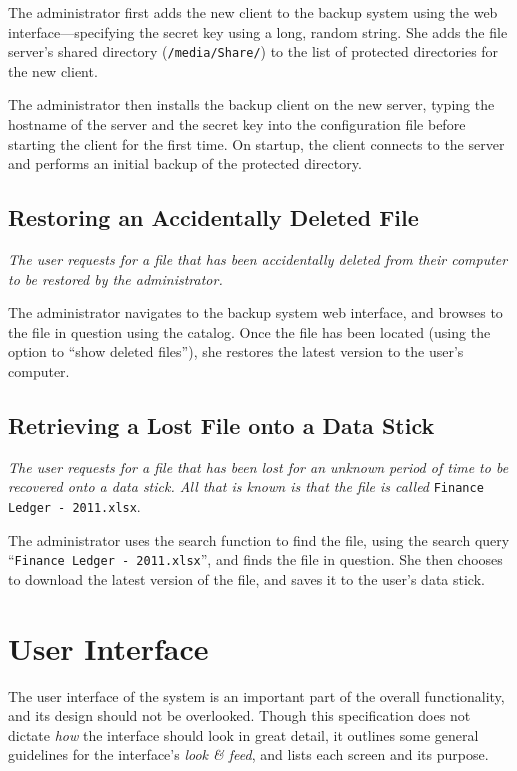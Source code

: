 The administrator first adds the new client to the backup system using the web
interface---specifying the secret key using a long, random string. She adds the
file server's shared directory (\verb!/media/Share/!) to the list of protected
directories for the new client.

The administrator then installs the backup client on the new server, typing
the hostname of the server and the secret key into the configuration file
before starting the client for the first time. On startup, the client connects
to the server and performs an initial backup of the protected directory.

\subsection{Restoring an Accidentally Deleted File}

\emph{The user requests for a file that has been accidentally deleted from
their computer to be restored by the administrator.}

The administrator navigates to the backup system web interface, and browses to
the file in question using the catalog. Once the file has been located (using
the option to ``show deleted files''), she restores the latest version to the
user's computer.

\subsection{Retrieving a Lost File onto a Data Stick}

\emph{The user requests for a file that has been lost for an unknown period of
time to be recovered onto a data stick. All that is known is that the file is
called} \verb!Finance Ledger - 2011.xlsx!.

The administrator uses the search function to find the file, using the search
query ``\verb!Finance Ledger - 2011.xlsx!'', and finds the file in question.
She then chooses to download the latest version of the file, and saves it to
the user's data stick.

\section{User Interface}

The user interface of the system is an important part of the overall
functionality, and its design should not be overlooked. Though this
specification does not dictate \emph{how} the interface should look in great
detail, it outlines some general guidelines for the interface's \emph{look \&
feed}, and lists each screen and its purpose.

